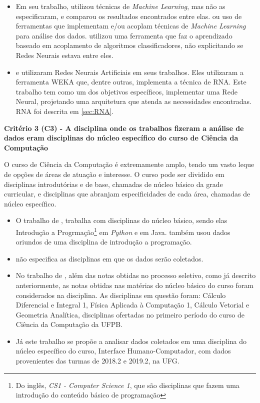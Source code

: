 \documentclass[
	12pt,				%
	openright,			%
	oneside,
	a4paper,			%
	english,			%
	french,				%
	spanish,			%
	brazil,				%
	]{abntex2}
\begin{document}
\begin{itemize}
    \item Em seu trabalho,  utilizou técnicas de \textit{Machine Learning}, mas não as especificaram, e comparou os resultados encontrados entre elas. ou uso de ferramentas que implementam e/ou acoplam técnicas de \textit{Machine Learning} para análise dos dados.  utilizou uma ferramenta que faz o aprendizado baseado em acoplamento de algoritmos classificadores, não explicitando se Redes Neurais estava entre eles.
    \item {} e  utilizaram Redes Neurais Artificiais em seus trabalhos. Eles utilizaram a ferramenta WEKA que, dentre outras, implementa a técnica de RNA. Este trabalho tem como um dos objetivos específicos, implementar uma Rede Neural, projetando uma arquitetura que atenda as necessidades encontradas. RNA foi descrita em \autoref{sec:RNA}.
\end{itemize}

\textbf{Critério 3 (C3) - A disciplina onde os trabalhos fizeram a análise de dados eram disciplinas do núcleo específico do curso de Ciência da Computação}

O curso de Ciência da Computação é extremamente amplo, tendo um vasto leque de opções de áreas de atuação e interesse. O curso pode ser dividido em disciplinas introdutórias e de base, chamadas de núcleo básico da grade curricular, e disciplinas que abranjam especificidades de cada área, chamadas de núcleo específico.

\begin{itemize}
    \item O trabalho de , trabalha com disciplinas do núcleo básico, sendo elas Introdução a Progrmação\footnote[4]{Do inglês, \textit{CS1 - Computer Science 1}, que são disciplinas que fazem uma introdução do conteúdo básico de programação} em \textit{Python} e em Java.  também usou dados oriundos de uma disciplina de introdução a programação.
    \item {} não especifica as disciplinas em que os dados serão coletados.
    \item No trabalho de , além das notas obtidas no processo seletivo, como já descrito anteriormente, as notas obtidas nas matérias do núcleo básico do curso foram considerados na disciplina. As disciplinas em questão foram: Cálculo Diferencial e Integral 1, Física Aplicada à Computação 1, Cálculo Vetorial e Geometria Analítica, disciplinas ofertadas no primeiro período do curso de Ciência da Computação da UFPB.
    \item Já este trabalho se propõe a analisar dados coletados em uma disciplina do núcleo específico do curso, Interface Humano-Computador, com dados provenientes das turmas de 2018.2 e 2019.2, na UFG.
\end{itemize}
\end{document}
